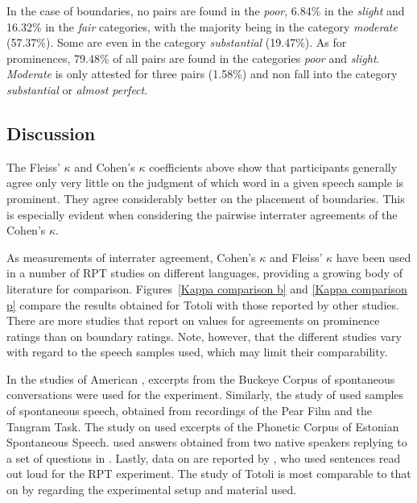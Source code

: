In the case of boundaries,  no pairs are found in the \textit{poor}, 6.84\% in the \textit{slight}  and 16.32\% in the \textit{fair} categories, with the majority being in the category \textit{moderate} (57.37\%). Some are even in the category \textit{substantial} (19.47\%). As for prominences, 79.48\% of all pairs are found in the categories \textit{poor} and \textit{slight}. \textit{Moderate} is only attested for three pairs (1.58\%) and non fall into the category \textit{substantial} or \textit{almost perfect}.




\subsection{Discussion}
\label{sec:discussion and comparison}

The Fleiss' $\kappa$ and Cohen's $\kappa$ coefficients above show that participants generally agree only very little on the judgment of which word in a given speech sample is prominent. They agree considerably better on the placement of boundaries. This is especially evident when considering the  pairwise interrater agreements of the Cohen's $\kappa$. 


As measurements of interrater agreement, Cohen’s $\kappa$ and Fleiss’ $\kappa$ have been used in a number of RPT studies on different languages, providing a growing body of literature for comparison.   Figures~\ref{Kappa comparison b} and \ref{Kappa comparison p} compare the results obtained for Totoli with those reported by other studies. There are more studies that report on values for agreements on prominence ratings than on boundary ratings. Note, however, that the different studies vary with regard to the speech samples used, which may limit their comparability.

In the studies of American  \citep{mo2008naive,cole2010signal}, excerpts from the Buckeye Corpus of spontaneous conversations \citep{Pitt.2007} were used for the  experiment. Similarly, the study of   \citep{riesberg2018perception, riesberg2020} used samples of spontaneous speech, obtained from recordings of the Pear Film \citep{chafe1980pear} and the Tangram Task. The  study on  \citep{Ots_2019} used excerpts of the Phonetic Corpus of Estonian Spontaneous Speech.  \citet{you2012determining} used answers obtained from two native speakers replying to a set of questions in . Lastly, data on  are reported by \citet{Baumann_2018}, who used  sentences  read out loud for the RPT experiment. The study of Totoli is  most comparable to that on   by \citet{riesberg2020} regarding the experimental setup and material used.



